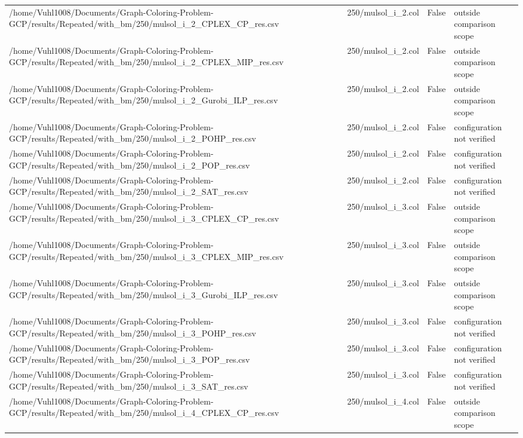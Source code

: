 \begin{table}[htbp]
\begin{tabular}{llll}
/home/Vuhl1008/Documents/Graph-Coloring-Problem-GCP/results/Repeated/with\_bm/250/mulsol\_i\_2\_CPLEX\_CP\_res.csv & 250/mulsol\_i\_2.col & False & outside comparison scope \\
/home/Vuhl1008/Documents/Graph-Coloring-Problem-GCP/results/Repeated/with\_bm/250/mulsol\_i\_2\_CPLEX\_MIP\_res.csv & 250/mulsol\_i\_2.col & False & outside comparison scope \\
/home/Vuhl1008/Documents/Graph-Coloring-Problem-GCP/results/Repeated/with\_bm/250/mulsol\_i\_2\_Gurobi\_ILP\_res.csv & 250/mulsol\_i\_2.col & False & outside comparison scope \\
/home/Vuhl1008/Documents/Graph-Coloring-Problem-GCP/results/Repeated/with\_bm/250/mulsol\_i\_2\_POHP\_res.csv & 250/mulsol\_i\_2.col & False & configuration not verified \\
/home/Vuhl1008/Documents/Graph-Coloring-Problem-GCP/results/Repeated/with\_bm/250/mulsol\_i\_2\_POP\_res.csv & 250/mulsol\_i\_2.col & False & configuration not verified \\
/home/Vuhl1008/Documents/Graph-Coloring-Problem-GCP/results/Repeated/with\_bm/250/mulsol\_i\_2\_SAT\_res.csv & 250/mulsol\_i\_2.col & False & configuration not verified \\
/home/Vuhl1008/Documents/Graph-Coloring-Problem-GCP/results/Repeated/with\_bm/250/mulsol\_i\_3\_CPLEX\_CP\_res.csv & 250/mulsol\_i\_3.col & False & outside comparison scope \\
/home/Vuhl1008/Documents/Graph-Coloring-Problem-GCP/results/Repeated/with\_bm/250/mulsol\_i\_3\_CPLEX\_MIP\_res.csv & 250/mulsol\_i\_3.col & False & outside comparison scope \\
/home/Vuhl1008/Documents/Graph-Coloring-Problem-GCP/results/Repeated/with\_bm/250/mulsol\_i\_3\_Gurobi\_ILP\_res.csv & 250/mulsol\_i\_3.col & False & outside comparison scope \\
/home/Vuhl1008/Documents/Graph-Coloring-Problem-GCP/results/Repeated/with\_bm/250/mulsol\_i\_3\_POHP\_res.csv & 250/mulsol\_i\_3.col & False & configuration not verified \\
/home/Vuhl1008/Documents/Graph-Coloring-Problem-GCP/results/Repeated/with\_bm/250/mulsol\_i\_3\_POP\_res.csv & 250/mulsol\_i\_3.col & False & configuration not verified \\
/home/Vuhl1008/Documents/Graph-Coloring-Problem-GCP/results/Repeated/with\_bm/250/mulsol\_i\_3\_SAT\_res.csv & 250/mulsol\_i\_3.col & False & configuration not verified \\
/home/Vuhl1008/Documents/Graph-Coloring-Problem-GCP/results/Repeated/with\_bm/250/mulsol\_i\_4\_CPLEX\_CP\_res.csv & 250/mulsol\_i\_4.col & False & outside comparison scope \\

\end{tabular}
\end{table}

